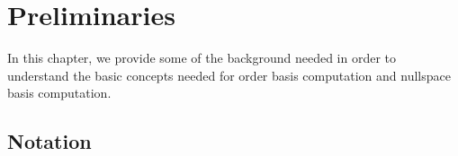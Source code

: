 
\chapter{Preliminaries}

\label{chap:Background}

In this chapter, we provide some of the background needed in order
to understand the basic concepts needed for order basis computation
and nullspace basis computation. %
\begin{comment}
, which provide lower bounds for the computational cost 
\end{comment}
{} %
\begin{comment}
The challenges of balancing input and handling unbalanced output are
discussed along with the techniques which we plan to use to overcome
the difficulties. We review the construction by \citet{Storjohann:2006}
which transforms the inputs to those having dimensions and degree
balance better suited for fast computation and discuss an idea from
\citet{storjohann-villard:2005} for handling the case where the output
degree is unbalanced.
\end{comment}



\section{\label{sec:Notation}Notation}

